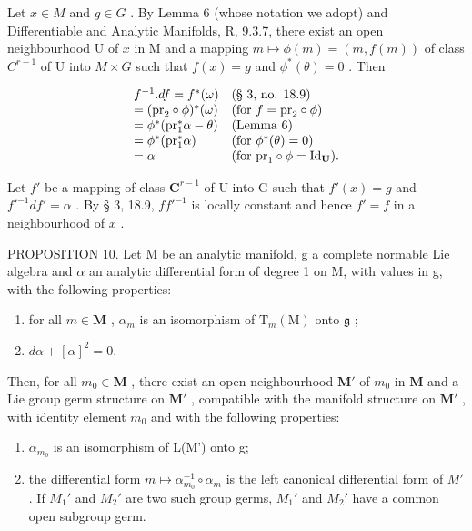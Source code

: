 Let \(x \in M\) and \(g \in G\) . By Lemma 6 (whose notation we adopt) and Differentiable and Analytic Manifolds, R, 9.3.7, there exist an open neighbourhood U of \(x\) in M and a mapping \(m \mapsto \phi(m) = (m, f(m))\) of class \(C^{r-1}\) of U into \(M \times G\) such that \(f(x) = g\) and \(\phi^*(\theta) = 0\) . Then

\[
\begin{array}{l l} f ^ {- 1}. d f = f ^ {*} (\omega) & \text {(§ 3, no. 18.9)} \\ = (\mathrm{pr} _ {2} \circ \phi) ^ {*} (\omega) & \text {(for \(f = \mathrm{pr} _ {2} \circ \phi\))} \\ = \phi^ {*} (\mathrm{pr} _ {1} ^ {*} \alpha - \theta) & \text {(Lemma 6)} \\ = \phi^ {*} (\mathrm{pr} _ {1} ^ {*} \alpha) & \text {(for \(\phi^ {*} (\theta) = 0\))} \\ = \alpha & \text {(for \(\mathrm{pr} _ {1} \circ \phi = \mathrm{Id} _ {\mathbf {U}}\))}. \end{array}
\]

Let \(f'\) be a mapping of class \(\mathbf{C}^{r-1}\) of U into G such that \(f'(x) = g\) and \(f'^{-1}df' = \alpha\) . By § 3, 18.9, \(ff'^{-1}\) is locally constant and hence \(f' = f\) in a neighbourhood of \(x\) .

PROPOSITION 10. Let M be an analytic manifold, g a complete normable Lie algebra and \(\alpha\) an analytic differential form of degree 1 on M, with values in g, with the following properties:

\begin{enumerate}
\def\labelenumi{(\alph{enumi})}
\item
  for all \(m \in \mathbf{M}\) , \(\alpha_{m}\) is an isomorphism of \(\mathrm{T}_{m}(\mathrm{M})\) onto \(\mathfrak{g}\) ;
\item
  \(d\alpha + [\alpha]^{2} = 0.\)
\end{enumerate}

Then, for all \(m_0 \in \mathbf{M}\) , there exist an open neighbourhood \(\mathbf{M}'\) of \(m_0\) in \(\mathbf{M}\) and a Lie group germ structure on \(\mathbf{M}'\) , compatible with the manifold structure on \(\mathbf{M}'\) , with identity element \(m_0\) and with the following properties:

\begin{enumerate}
\def\labelenumi{(\roman{enumi})}
\item
  \(\alpha_{m_{0}}\) is an isomorphism of L(M') onto g;
\item
  the differential form \(m \mapsto \alpha_{m_0}^{-1} \circ \alpha_m\) is the left canonical differential form of \(M'\) . If \(M_1'\) and \(M_2'\) are two such group germs, \(M_1'\) and \(M_2'\) have a common open subgroup germ.
\end{enumerate}

